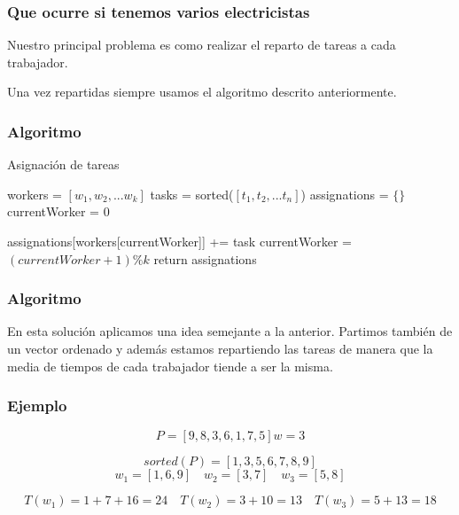 \documentclass[spanish]{beamer}
\begin{document}
\begin{frame}\frametitle{Que ocurre si tenemos varios electricistas}
  Nuestro principal problema es como realizar el reparto de tareas a
  cada trabajador.

  \pause

  Una vez repartidas siempre usamos el algoritmo descrito
  anteriormente.
\end{frame}

\begin{frame}\frametitle{Algoritmo}
  \begin{algorithm}[H]
    \caption{Asignación de tareas}
    \begin{algorithmic}
      \State workers = $[w_1, w_2, ... w_k]$
      \State tasks = sorted($[t_1, t_2, ... t_n]$)
      \State assignations = $\{\}$
      \State currentWorker = 0

      \State assignations[workers[currentWorker]] += task
      \State currentWorker = $(currentWorker + 1) \% k$
      \EndFor
      \State return assignations
      \EndProcedure
    \end{algorithmic}
  \end{algorithm}
\end{frame}

\begin{frame}\frametitle{Algoritmo}
  En esta solución aplicamos una idea semejante a la
  anterior. Partimos también de un vector ordenado y además estamos
  repartiendo las tareas de manera que la media de tiempos de cada
  trabajador tiende a ser la misma.
\end{frame}

\begin{frame}\frametitle{Ejemplo}

  \[
    P = [9,8,3,6,1,7,5]
    w = 3 
  \]
  \pause
  
  $$sorted(P) = [1,3,5,6,7,8,9]$$
  \pause
  \[
    w_1 = [1,6,9] \quad
    w_2 = [3,7] \quad
    w_3 = [5,8]
  \]

  \pause

  \[
    T(w_1) = 1 + 7 + 16 = 24 \quad
    T(w_2) = 3 + 10 = 13 \quad
    T(w_3) = 5 + 13 = 18
  \]
\end{frame}
\end{document}
